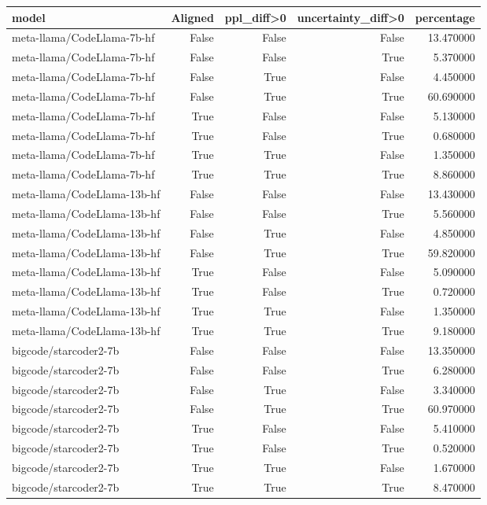 \begin{tabular}{lrrrr}
\toprule
model & Aligned & ppl_diff>0 & uncertainty_diff>0 & percentage \\
\midrule
meta-llama/CodeLlama-7b-hf & False & False & False & 13.470000 \\
meta-llama/CodeLlama-7b-hf & False & False & True & 5.370000 \\
meta-llama/CodeLlama-7b-hf & False & True & False & 4.450000 \\
meta-llama/CodeLlama-7b-hf & False & True & True & 60.690000 \\
meta-llama/CodeLlama-7b-hf & True & False & False & 5.130000 \\
meta-llama/CodeLlama-7b-hf & True & False & True & 0.680000 \\
meta-llama/CodeLlama-7b-hf & True & True & False & 1.350000 \\
meta-llama/CodeLlama-7b-hf & True & True & True & 8.860000 \\
meta-llama/CodeLlama-13b-hf & False & False & False & 13.430000 \\
meta-llama/CodeLlama-13b-hf & False & False & True & 5.560000 \\
meta-llama/CodeLlama-13b-hf & False & True & False & 4.850000 \\
meta-llama/CodeLlama-13b-hf & False & True & True & 59.820000 \\
meta-llama/CodeLlama-13b-hf & True & False & False & 5.090000 \\
meta-llama/CodeLlama-13b-hf & True & False & True & 0.720000 \\
meta-llama/CodeLlama-13b-hf & True & True & False & 1.350000 \\
meta-llama/CodeLlama-13b-hf & True & True & True & 9.180000 \\
bigcode/starcoder2-7b & False & False & False & 13.350000 \\
bigcode/starcoder2-7b & False & False & True & 6.280000 \\
bigcode/starcoder2-7b & False & True & False & 3.340000 \\
bigcode/starcoder2-7b & False & True & True & 60.970000 \\
bigcode/starcoder2-7b & True & False & False & 5.410000 \\
bigcode/starcoder2-7b & True & False & True & 0.520000 \\
bigcode/starcoder2-7b & True & True & False & 1.670000 \\
bigcode/starcoder2-7b & True & True & True & 8.470000 \\

\end{tabular}
